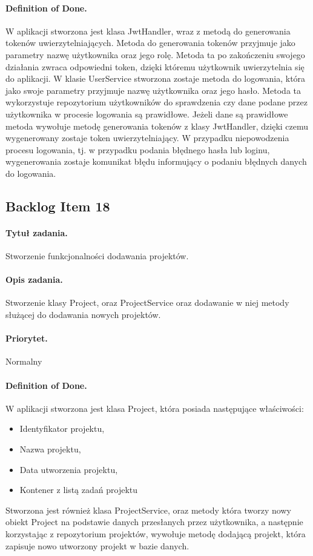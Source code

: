 \documentclass[a4paper]{article}
\begin{document}
\paragraph{Definition of Done.} W aplikacji stworzona jest klasa JwtHandler, wraz z metodą do generowania tokenów uwierzytelniających. Metoda do generowania tokenów przyjmuje jako parametry nazwę użytkownika oraz jego rolę. Metoda ta po zakończeniu swojego działania zwraca odpowiedni token, dzięki któremu użytkownik uwierzytelnia się do aplikacji. W klasie UserService stworzona zostaje metoda do logowania, która jako swoje parametry przyjmuje nazwę użytkownika oraz jego hasło. Metoda ta wykorzystuje repozytorium użytkowników do sprawdzenia czy dane podane przez użytkownika w procesie logowania są prawidłowe. Jeżeli dane są prawidłowe metoda wywołuje metodę generowania tokenów z klasy JwtHandler, dzięki czemu wygenerowany zostaje token uwierzytelniający. W przypadku niepowodzenia procesu logowania, tj. w przypadku podania błędnego hasła lub loginu, wygenerowania zostaje komunikat błędu informujący o podaniu błędnych danych do logowania.

\subsection{Backlog Item 18} 
\paragraph{Tytuł zadania.}  Stworzenie funkcjonalności dodawania projektów.
\paragraph{Opis zadania.} Stworzenie klasy Project, oraz ProjectService oraz dodawanie w niej metody służącej do dodawania nowych projektów. 
\paragraph{Priorytet.} Normalny
\paragraph{Definition of Done.} W aplikacji stworzona jest klasa Project, która posiada następujące właściwości:
\begin{itemize}
\item Identyfikator projektu, 
\item Nazwa projektu, 
\item Data utworzenia projektu,
\item Kontener z listą zadań projektu
\end{itemize}
Stworzona jest również klasa ProjectService, oraz metody która tworzy nowy obiekt Project na podstawie danych przesłanych przez użytkownika, a następnie korzystając z repozytorium projektów, wywołuje metodę dodającą projekt, która zapisuje nowo utworzony projekt w bazie danych. 
\end{document}
